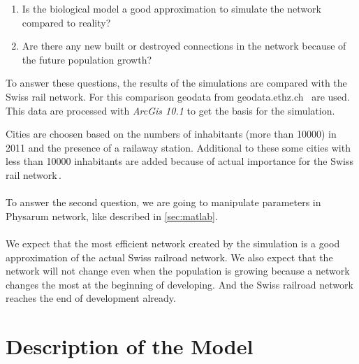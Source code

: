 \documentclass[11pt]{scrartcl}
\begin{document}
\begin{enumerate}
	\item Is the biological model a good approximation to simulate the network compared to reality?
	\item Are there any new built or destroyed connections in the network because of the future population growth?
\end{enumerate}

To answer these questions, the results of the simulations are compared with the Swiss rail network. For this comparison geodata from geodata.ethz.ch~\cite{gis_data} are used. This data are processed with \textit{ArcGis 10.1} to get the basis for the simulation.

Cities are choosen based on the numbers of inhabitants (more than 10000) in 2011 and the presence of a railaway station. Additional to these some cities with less than 10000 inhabitants are added because of actual importance for the Swiss rail network\,\cite{bfs}. ~\\
~\\
To answer the second question, we are going to manipulate parameters in Physarum network, like described  in \ref{sec:matlab}.\\
~\\
We expect that the most efficient network created by the simulation is a good approximation of the actual Swiss railroad network. We also expect that the network will not change even when the population is growing because a network changes the most at the beginning of developing. And the Swiss railroad network reaches the end of development already.




\section{Description of the Model}
\label{sec:description}
\end{document}
